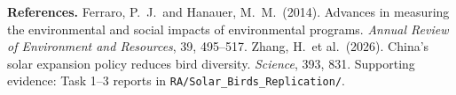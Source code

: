 \documentclass[10pt]{article}
\begin{document}
\vspace{4pt}
{\footnotesize\textbf{References.} Ferraro, P.\ J.\ and Hanauer, M.\ M.\ (2014). Advances in measuring the environmental and social impacts of environmental programs. \textit{Annual Review of Environment and Resources}, 39, 495--517. Zhang, H.\ et al.\ (2026). China's solar expansion policy reduces bird diversity. \textit{Science}, 393, 831. Supporting evidence: Task 1--3 reports in \texttt{RA/Solar\_Birds\_Replication/}.}
\end{document}
